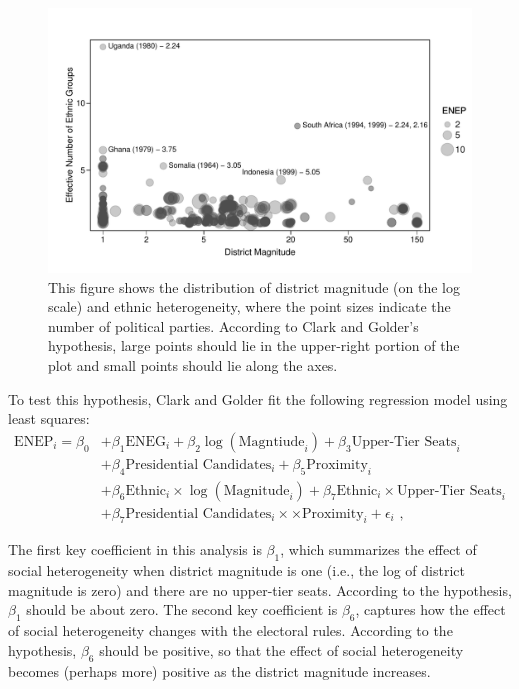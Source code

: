 \documentclass[12pt]{article}
\begin{document}
\begin{figure}[H]
\begin{center}
\includegraphics[scale = 0.8]{figs/cg-scatter.pdf}
\caption{This figure shows the distribution of district magnitude (on the log scale) and ethnic heterogeneity, where the point sizes indicate the number of political parties. According to Clark and Golder's hypothesis, large points should lie in the upper-right portion of the plot and small points should lie along the axes.}\label{fig:cg-scatter}
\end{center}
\end{figure}

To test this hypothesis, Clark and Golder fit the following regression model using least squares:
\begin{align*}
\text{ENEP}_i = \beta_0 &+ \beta_1 \text{ENEG}_i + \beta_2 \log(\text{Magntiude}_i) + \beta_3 \text{Upper-Tier Seats}_i\\
                                                     &+\beta_4 \text{Presidential Candidates}_i + \beta_5 \text{Proximity}_i\\
                                                     &+ \beta_6 \text{Ethnic}_i \times \log (\text{Magnitude}_i) + \beta_7 \text{Ethnic}_i \times \text{Upper-Tier Seats}_i\\
                                                     &+ \beta_7 \text{Presidential Candidates}_i \times \times \text{Proximity}_i + \epsilon_i\text{ ,}
\end{align*}

The first key coefficient in this analysis is $\beta_1$, which summarizes the effect of social heterogeneity when district magnitude is one (i.e., the log of district magnitude is zero) and there are no upper-tier seats. According to the hypothesis, $\beta_1$ should be about zero. The second key coefficient is $\beta_6$, captures how the effect of social heterogeneity changes with the electoral rules. According to the hypothesis, $\beta_6$ should be positive, so that the effect of social heterogeneity becomes (perhaps more) positive as the district magnitude increases.
\end{document}
